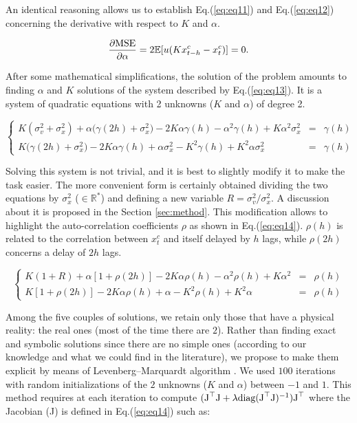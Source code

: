 \documentclass[preprint,12pt,3p]{elsarticle}
\begin{document}
An identical reasoning allows us to establish Eq.(\ref{eq:eq11}) and Eq.(\ref{eq:eq12}) concerning the derivative with respect to $K$ and $\alpha$. 

\begin{equation}
\label{eq:eq12}
\frac{\partial \textnormal{MSE}}{\partial \alpha}=2\mathbb{E}[u(K x^c_{t-h}-x^c_t)]=0.
\end{equation}

After some mathematical simplifications, the solution of the problem amounts to finding $\alpha$ and $K$ solutions of the system described by Eq.(\ref{eq:eq13}). It is a system of quadratic equations with 2 unknowns ($K$ and $\alpha$) of degree 2.

\begin{equation}
\label{eq:eq13}
\left \{
\begin{array}{rcl}
K(\sigma^2_{v}+\sigma_x^2)+\alpha\big(\gamma(2h)+\sigma_x^2\big)-2K\alpha\gamma(h)-\alpha^2\gamma(h)+K\alpha^2\sigma_x^2&=&\gamma(h) \\
K\big(\gamma(2h)+\sigma_x^2\big)-2K\alpha\gamma(h)+\alpha\sigma_x^2-K^2\gamma(h)+K^2\alpha\sigma_x^2&=&\gamma(h)
\end{array}
 \right.
\end{equation}

Solving this system is not trivial, and it is best to slightly modify it to make the task easier. The more convenient form is certainly obtained dividing the two equations by $\sigma_x^2$ ($\in \mathbb{R^*}$) and defining a new variable $R=\sigma^2_{v}/\sigma_x^2$. A discussion about it is proposed in the Section \ref{sec:method}. This modification allows to highlight the auto-correlation coefficients $\rho$ as shown in Eq.(\ref{eq:eq14}). $\rho(h)$ is related to the correlation between $x^c_t$ and itself delayed by $h$ lags, while $\rho(2h)$ concerns a delay of $2h$ lags.

\begin{equation}
\label{eq:eq14}
\left \{
\begin{array}{rcl}
K(1+R)+\alpha[1+\rho(2h)]-2K\alpha\rho(h)-\alpha^2\rho(h)+K\alpha^2&=&\rho(h) \\
K[1+\rho(2h)]-2K\alpha\rho(h)+\alpha-K^2\rho(h)+K^2\alpha&=&\rho(h)
\end{array}
\right.
\end{equation}

Among the five couples of solutions, we retain only those that have a physical reality: the real ones (most of the time there are $2$). Rather than finding exact and symbolic solutions since there are no simple ones (according to our knowledge and what we could find in the literature), we propose to make them explicit by means of Levenberg–Marquardt algorithm \citep{10.1007/BFb0067700}. We used $100$ iterations with random initializations of the $2$ unknowns ($K$ and $\alpha$) between $-1$ and $1$. This method requires at each iteration to compute $(\textnormal{J}^\top \textnormal{J}+\lambda \textnormal{diag}(\textnormal{J}^\top \textnormal{J})^{-1})\textnormal{J}^\top$ where the Jacobian (J) is defined in Eq.(\ref{eq:eq14}) such as:  
\end{document}
